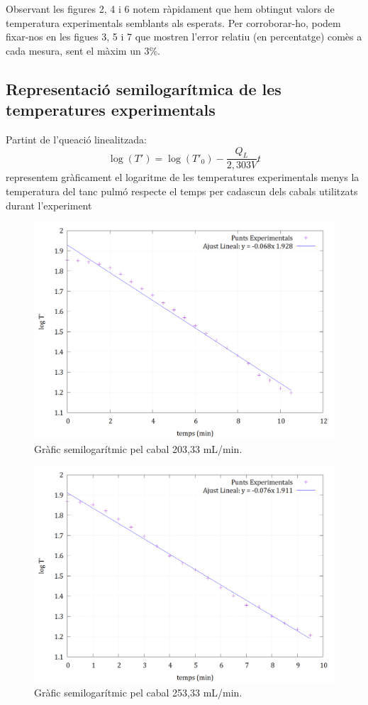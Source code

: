 \documentclass[10pt, twoside]{article}
\begin{document}
Observant les figures 2, 4 i 6 notem ràpidament que hem obtingut valors de temperatura experimentals semblants als esperats. Per corroborar-ho, podem fixar-nos en les figues 3, 5 i 7 que mostren l'error relatiu (en percentatge) comès a cada mesura, sent el màxim un 3\%.

\subsection{Representació semilogarítmica de les temperatures experimentals}
Partint de l'queació linealitzada: 
\begin{equation}
    \log(T') = \log(T'_0) - \frac{Q_L}{2,303V} t
\end{equation}
representem gràficament el logaritme de les temperatures experimentals menys la temperatura del tanc pulmó respecte el temps per cadascun dels cabals utilitzats durant l'experiment

\begin{figure}[H]
    \centering
    \includegraphics[width=0.7\linewidth]{ajustsemilog203.png}
    \caption{Gràfic semilogarítmic pel cabal 203,33 mL/min.}
    \label{fig2}
\end{figure}

\begin{figure}[H]
    \centering
    \includegraphics[width=0.7\linewidth]{ajustsemilog253.png}
    \caption{Gràfic semilogarítmic pel cabal 253,33 mL/min.}
    \label{fig3}
\end{figure}
\end{document}
